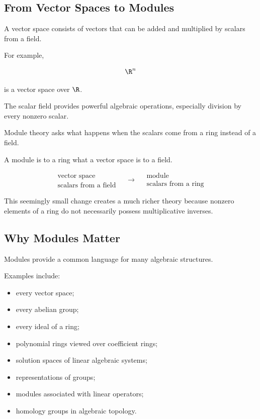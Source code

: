 \subsection{From Vector Spaces to Modules}
\label{subsec:vector-spaces-to-modules}

A vector space consists of vectors that can be added and multiplied by
scalars from a field.

For example,

\[ \R^n \]

is a vector space over \(\R\).

The scalar field provides powerful algebraic operations, especially division
by every nonzero scalar.

Module theory asks what happens when the scalars come from a ring instead of
a field.

\begin{conceptbox}
A module is to a ring what a vector space is to a field.

\[
\boxed{
\begin{array}{c}
\text{vector space}\\
\text{scalars from a field}
\end{array}
\quad\longrightarrow\quad
\begin{array}{c}
\text{module}\\
\text{scalars from a ring}
\end{array}}
\]
\end{conceptbox}

This seemingly small change creates a much richer theory because nonzero
elements of a ring do not necessarily possess multiplicative inverses.

\subsection{Why Modules Matter}
\label{subsec:why-modules-matter}

Modules provide a common language for many algebraic structures.

Examples include:

\begin{itemize}
    \item every vector space;
    \item every abelian group;
    \item every ideal of a ring;
    \item polynomial rings viewed over coefficient rings;
    \item solution spaces of linear algebraic systems;
    \item representations of groups;
    \item modules associated with linear operators;
    \item homology groups in algebraic topology.
\end{itemize}

